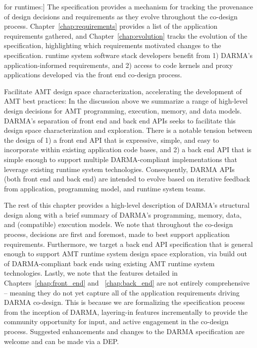 \begin{compactdesc}
  for runtimes:]
  The specification provides a mechanism for tracking the
  provenance of design decisions and requirements as they evolve throughout the
  \gls{co-design} process. Chapter~\ref{chap:requirements} provides a list of the application
  requirements gathered,  and Chapter~\ref{chap:evolution} tracks the evolution of
  the specification, highlighting which requirements motivated changes to the specification.
  \Gls{runtime system} software stack developers benefit 
  from 1) \gls{DARMA}’s application-informed requirements, and 2) access to code
  kernels and proxy applications developed via the \gls{front end}
  \gls{co-design} process.
\item[Facilitate AMT design space characterization, accelerating the
development of AMT best practices:]
  In the discussion above we summarize a range of high-level design decisions for
  \gls{AMT} programming, execution, memory, and data models. \gls{DARMA}'s
  separation of \gls{front end} and \gls{back end} \glspl{API} seeks to
  facilitate this design space characterization and exploration.  There 
  is a notable tension between the design of 1) a \gls{front end} \gls{API} that is expressive, simple, 
  and easy to incorporate within existing application code bases, and 2) a
  \gls{back end} \gls{API} that is simple enough 
  to support multiple \gls{DARMA}-compliant implementations that leverage existing \gls{runtime
  system} technologies. 
  Consequently, \gls{DARMA} \gls{API}s (both \gls{front end} and \gls{back end}) are
  intended to evolve based on iterative feedback from 
  application, \gls{programming model}, and \gls{runtime system} teams. 
\end{compactdesc}


The rest of this chapter provides a high-level description of 
\gls{DARMA}'s structural design  along with a brief summary of \gls{DARMA}'s programming,
memory, data, and (compatible) execution models. We note that throughout the
\gls{co-design} process, decisions are first and foremost, 
made to best support application requirements.  Furthermore, we target a
\gls{back end} \gls{API} specification that is general enough to support 
\gls{AMT} \gls{runtime system}
design space exploration, via build out of \gls{DARMA}-compliant
back ends using existing \gls{AMT} \gls{runtime system}
technologies.
Lastly, we note that the features detailed in Chapters~\ref{chap:front_end} and
~\ref{chap:back_end}  are not entirely comprehensive -- meaning they do not yet capture all of the
application requirements driving \gls{DARMA} \gls{co-design}.  This is because 
we are formalizing the specification process from the inception of \gls{DARMA}, layering-in features incrementally to
provide the community opportunity for input, and active engagement in the
\gls{co-design} process.  Suggested enhancements and changes 
to the \gls{DARMA} specification are welcome and can be made via a \gls{DEP}. 

